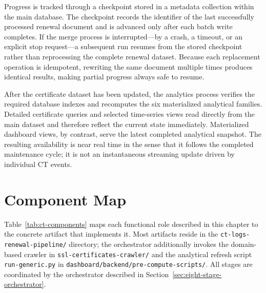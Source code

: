 Progress is tracked through a checkpoint stored in a metadata collection
within the main database. The checkpoint records the identifier of the last
successfully processed renewal document and is advanced only after each batch
write completes. If the merge process is interrupted---by a crash, a timeout,
or an explicit stop request---a subsequent run resumes from the stored
checkpoint rather than reprocessing the complete renewal dataset. Because
each replacement operation is idempotent, rewriting the same document
multiple times produces identical results, making partial progress always
safe to resume.

After the certificate dataset has been updated, the analytics process
verifies the required database indexes and recomputes the six materialized
analytical families. Detailed certificate queries and selected time-series
views read directly from the main dataset and therefore reflect the current
state immediately. Materialized dashboard views, by contrast, serve the
latest completed analytical snapshot. The resulting availability is near real
time in the sense that it follows the completed maintenance cycle; it is not
an instantaneous streaming update driven by individual CT events.

\section{Component Map}
\label{sec:ct-component-map}

Table~\ref{tab:ct-components} maps each functional role described in this
chapter to the concrete artifact that implements it. Most artifacts reside in
the \texttt{ct-logs-renewal-pipeline/} directory; the orchestrator additionally
invokes the domain-based crawler in \texttt{ssl-certificates-crawler/} and the
analytical refresh script \texttt{run-generic.py} in
\texttt{dashboard/backend/pre-compute-scripts/}. All stages are coordinated by
the orchestrator described in Section~\ref{sec:eight-stage-orchestrator}.

\renewcommand{\arraystretch}{1.3}

